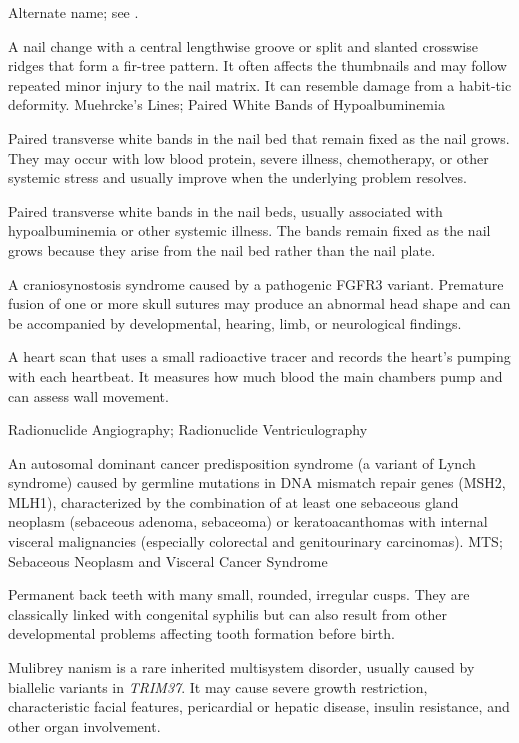  Alternate name; see .

 A nail change with a central
  lengthwise groove or split and slanted crosswise ridges that form a
  fir-tree pattern. It often affects the thumbnails and may follow
  repeated minor injury to the nail matrix. It can resemble damage from
  a habit-tic deformity.
\synonyms
Muehrcke's Lines; Paired White Bands of Hypoalbuminemia

 Paired transverse white bands in the nail bed that remain fixed as the nail grows. They may occur with low blood protein, severe illness, chemotherapy, or other systemic stress and usually improve when the underlying problem resolves.

 Paired transverse white bands in the nail beds, usually associated with hypoalbuminemia or other systemic illness. The bands remain fixed as the nail grows because they arise from the nail bed rather than the nail plate.

 A craniosynostosis syndrome caused by a pathogenic FGFR3 variant. Premature fusion of
one or more skull sutures may produce an abnormal head shape and can be accompanied by
developmental, hearing, limb, or neurological findings.

 A heart scan that uses a small radioactive tracer and records the heart's pumping with each heartbeat. It measures how much blood the main chambers pump and can assess wall movement.

\synonyms
Radionuclide Angiography; Radionuclide Ventriculography

 An autosomal dominant cancer predisposition syndrome (a variant of Lynch syndrome) caused by germline mutations in DNA mismatch repair genes (MSH2, MLH1), characterized by the combination of at least one sebaceous gland neoplasm (sebaceous adenoma, sebaceoma) or keratoacanthomas with internal visceral malignancies (especially colorectal and genitourinary carcinomas).
\synonyms
MTS; Sebaceous Neoplasm and Visceral Cancer Syndrome

 Permanent back teeth with many small, rounded, irregular cusps. They are classically linked with congenital syphilis but can also result from other developmental problems affecting tooth formation before birth.

 Mulibrey nanism is a rare inherited multisystem disorder, usually caused by biallelic variants in \textit{TRIM37}. It may cause severe growth restriction, characteristic facial features, pericardial or hepatic disease, insulin resistance, and other organ involvement.

